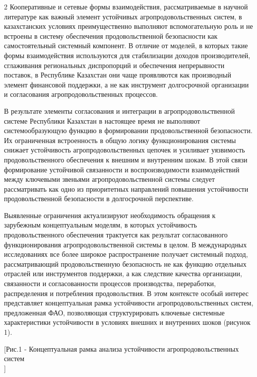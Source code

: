 \begin{multicols}{2}
Кооперативные и сетевые формы взаимодействия, рассматриваемые в научной
литературе как важный элемент устойчивых агропродовольственных систем, в
казахстанских условиях преимущественно выполняют вспомогательную роль и
не встроены в систему обеспечения продовольственной безопасности как
самостоятельный системный компонент. В отличие от моделей, в которых
такие формы взаимодействия используются для стабилизации доходов
производителей, сглаживания региональных диспропорций и обеспечения
непрерывности поставок, в Республике Казахстан они чаще проявляются как
производный элемент финансовой поддержки, а не как инструмент
долгосрочной организации и согласования агропродовольственных процессов.

В результате элементы согласования и интеграции в агропродовольственной
системе Республики Казахстан в настоящее время не выполняют
системообразующую функцию в формировании продовольственной безопасности.
Их ограниченная встроенность в общую логику функционирования системы
снижает устойчивость агропродовольственных цепочек и усиливает
уязвимость продовольственного обеспечения к внешним и внутренним шокам.
В этой связи формирование устойчивой связанности и воспроизводимости
взаимодействий между ключевыми звеньями агропродовольственной системы
следует рассматривать как одно из приоритетных направлений повышения
устойчивости продовольственной безопасности в долгосрочной перспективе.

Выявленные ограничения актуализируют необходимость обращения к
зарубежным концептуальным моделям, в которых устойчивость
продовольственного обеспечения трактуется как результат согласованного
функционирования агропродовольственной системы в целом. В международных
исследованиях все более широкое распространение получает системный
подход, рассматривающий продовольственную безопасность не как функцию
отдельных отраслей или инструментов поддержки, а как следствие качества
организации, связанности и согласованности процессов производства,
переработки, распределения и потребления продовольствия. В этом
контексте особый интерес представляет концептуальная рамка устойчивости
агропродовольственных систем, предложенная ФАО, позволяющая
структурировать ключевые системные характеристики устойчивости в
условиях внешних и внутренних шоков (рисунок 1).
\end{multicols}

[Рис.1 - Концептуальная рамка анализа устойчивости
агропродовольственных систем\\]

